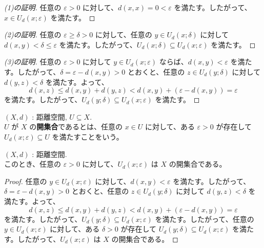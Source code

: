 \documentclass[article,paper=a4paper]{jlreq}
\begin{document}
\begin{proof}[(1)の証明]
    任意の $\varepsilon > 0$ に対して、$d(x,x) = 0 < \varepsilon$ を満たす。したがって、$x \in U_d(x;\varepsilon)$ を満たす。
\end{proof}

\begin{proof}[(2)の証明]
    任意の $\varepsilon \geq \delta > 0$ に対して、任意の $y \in U_d(x;\delta)$ に対して $d(x,y) < \delta \leq \varepsilon$ を満たす。したがって、$U_d(x;\delta) \subseteq U_d(x;\varepsilon)$ を満たす。
\end{proof}

\begin{proof}[(3)の証明]
    任意の $\varepsilon > 0$ に対して $y \in U_d(x;\varepsilon)$ ならば、$d(x,y) < \varepsilon$ を満たす。したがって、$\delta = \varepsilon - d(x,y) > 0$ とおくと、任意の $z \in U_d(y;\delta)$ に対して $d(y,z) < \delta$ を満たす。よって、
    \[d(x,z) \leq d(x,y) + d(y,z) < d(x,y) + (\varepsilon - d(x,y)) = \varepsilon\]
    を満たす。したがって、$U_d(y;\delta) \subseteq U_d(x;\varepsilon)$ を満たす。
\end{proof}

\begin{dfn}
    \quad $(X,d)$ : 距離空間, $U \subseteq X$.\\
    $U$ が $X$ の\textbf{開集合}であるとは、任意の $x \in U$ に対して、ある $\varepsilon > 0$ が存在して $U_d(x;\varepsilon) \subseteq U$ を満たすことをいう。
\end{dfn}

\begin{prop}
    \quad $(X,d)$ : 距離空間.\\
    このとき、任意の $\varepsilon > 0$ に対して、$U_d(x;\varepsilon)$ は $X$ の開集合である。
\end{prop}

\begin{proof}
    任意の $y \in U_d(x;\varepsilon)$ に対して、$d(x,y) < \varepsilon$ を満たす。したがって、$\delta = \varepsilon - d(x,y) > 0$ とおくと、任意の $z \in U_d(y;\delta)$ に対して $d(y,z) < \delta$ を満たす。よって、
    \[d(x,z) \leq d(x,y) + d(y,z) < d(x,y) + (\varepsilon - d(x,y)) = \varepsilon\]
    を満たす。したがって、$U_d(y;\delta) \subseteq U_d(x;\varepsilon)$ を満たす。したがって、任意の $y \in U_d(x;\varepsilon)$ に対して、ある $\delta > 0$ が存在して $U_d(y;\delta) \subseteq U_d(x;\varepsilon)$ を満たす。したがって、$U_d(x;\varepsilon)$ は $X$ の開集合である。
\end{proof}
\end{document}
